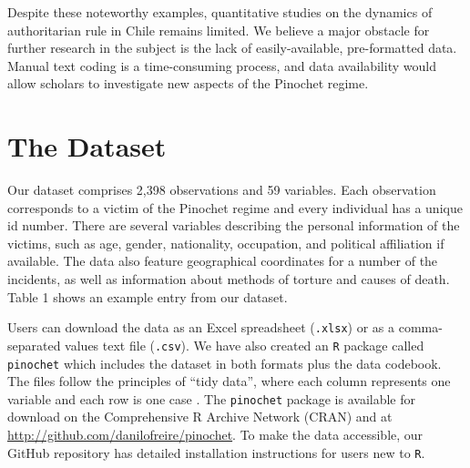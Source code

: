 \documentclass[12pt,a4paper,]{article}
\begin{document}
Despite these noteworthy examples, quantitative studies on the dynamics
of authoritarian rule in Chile remains limited. We believe a major
obstacle for further research in the subject is the lack of
easily-available, pre-formatted data. Manual text coding is a
time-consuming process, and data availability would allow scholars to
investigate new aspects of the Pinochet regime.

\hypertarget{the-dataset}{%
\section{The Dataset}\label{the-dataset}}

Our dataset comprises 2,398 observations and 59 variables. Each
observation corresponds to a victim of the Pinochet regime and every
individual has a unique id number. There are several variables
describing the personal information of the victims, such as age, gender,
nationality, occupation, and political affiliation if available. The
data also feature geographical coordinates for a number of the
incidents, as well as information about methods of torture and causes of
death. Table 1 shows an example entry from our dataset.

Users can download the data as an Excel spreadsheet (\texttt{.xlsx}) or
as a comma-separated values text file (\texttt{.csv}). We have also
created an \texttt{R} package called \texttt{pinochet} which includes
the dataset in both formats plus the data codebook. The files follow the
principles of ``tidy data'', where each column represents one variable
and each row is one case \citep{wickham2014tidy}. The \texttt{pinochet}
package is available for download on the Comprehensive R Archive Network
(CRAN) and at \url{http://github.com/danilofreire/pinochet}. To make the
data accessible, our GitHub repository has detailed installation
instructions for users new to \texttt{R}.

\newpage
\end{document}
